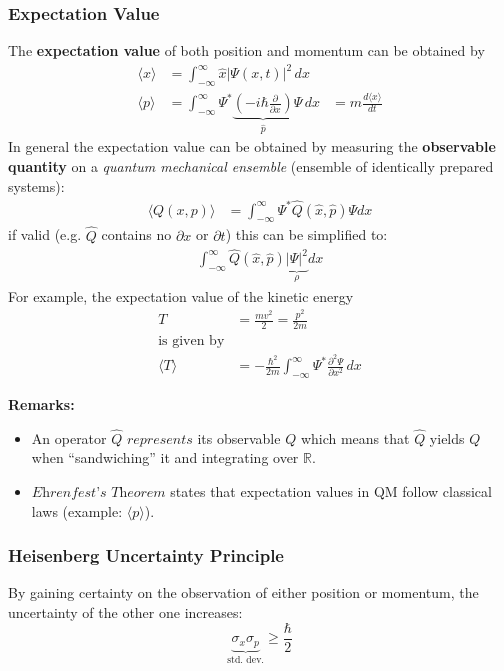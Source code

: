 \subsubsection{Expectation Value}
The \textbf{expectation value} of both position and momentum can be obtained by
\begin{align*}
    \langle x \rangle & = \int_{-\infty}^{\infty} \hat{x} |\Psi(x,t)|^2 \, dx                                                                                                         \\
    \langle p \rangle & = \int_{-\infty}^{\infty} \Psi^* \underbrace{\left(-i\hbar \frac{\partial}{\partial x}\right)}_{\hat{p}} \Psi \, dx & = m \frac{d\langle x \rangle}{dt}
\end{align*}
In general the expectation value can be obtained by measuring the \textbf{observable quantity} on a \textit{quantum mechanical ensemble} (ensemble of identically prepared systems):
\begin{align*}
    \langle Q(x,p)\rangle & = \int_{-\infty}^{\infty}\Psi^*\hat{Q}(\hat{x},\hat{p})\Psi dx
\end{align*}
if valid (e.g. $\hat{Q}$ contains no $\partial{x}$ or $\partial{t}$) this can be simplified to:\\
\begin{align*}
    \int_{-\infty}^{\infty}\hat{Q}(\hat{x},\hat{p}) \underbrace{|\Psi|^2}_{\rho} dx
\end{align*}
For example, the expectation value of the kinetic energy
\begin{align*}
    T                 & =\frac{mv^2}{2}=\frac{p^2}{2m}                                                             \\
    \text{is given by}                                                                                             \\
    \langle T \rangle & = -\frac{\hbar^2}{2m}\int_{-\infty}^{\infty}\Psi^*\frac{\partial^2\Psi}{\partial x^2} \,dx
\end{align*}

\textbf{Remarks:}
\begin{itemize}
    \item An operator $\hat{Q}$ $\textit{represents}$ its observable $Q$ which means that $\hat{Q}$ yields $Q$ when ``sandwiching'' it and integrating over $\mathbb{R}$.
    \item $\textit{Ehrenfest's Theorem}$ states that expectation values in QM follow classical laws (example: $\langle p \rangle$).
\end{itemize}

\subsubsection{Heisenberg Uncertainty Principle}
By gaining certainty on the observation of either position or momentum, the uncertainty of the other one increases:
\begin{equation*}
    \underbrace{\sigma_x\sigma_p}_{\text{std.\ dev.}} \geq \frac{\hbar}{2}
\end{equation*}


